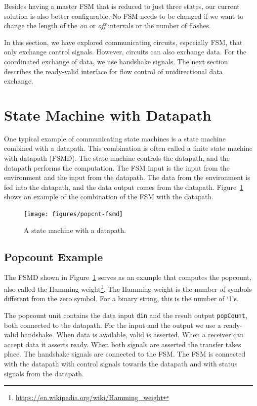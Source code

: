 \documentclass[%
    10pt,
    headinclude, footexclude,
    openright, %
    notitlepage,
    cleardoubleempty,
    headsepline,
    pointlessnumbers,
    bibtotoc, idxtotoc,
    ]{scrbook}
\newcommand{\code}[1]{{\small{\texttt{#1}}}}
\newcommand{\myref}[2]{\href{#1}{#2}}
\renewcommand{\myref}[2]{{#2}{\footnote{\url{#1}}}}
\begin{document}

Besides having a master FSM that is reduced to just three states, our current solution
is also better configurable. No FSM needs to be changed if we want to change
the length of the \emph{on} or \emph{off} intervals or the number of flashes.

In this section, we have explored communicating circuits, especially FSM, that
only exchange control signals. However, circuits can also exchange data.
For the coordinated exchange of data, we use handshake signals.
The next section describes the ready-valid interface for flow control of
unidirectional data exchange.

\section{State Machine with Datapath}

One typical example of communicating state machines is a state machine
combined with a datapath. This combination is often called a finite state machine
with datapath (FSMD). The state machine controls the datapath, and the datapath
performs the computation. The FSM input is the input from the environment and the input
from the datapath. The data from the environment is fed into the datapath, and the
data output comes from the datapath. Figure~\ref{fig:popcnt-fsmd} shows an example
of the combination of the FSM with the datapath.

\begin{figure}
  \centering
  \texttt{[image: figures/popcnt-fsmd]}
  \caption{A state machine with a datapath.}
  \label{fig:popcnt-fsmd}
\end{figure}

\subsection{Popcount Example}

The FSMD shown in Figure~\ref{fig:popcnt-fsmd} serves as an example that computes the
popcount, also called the \myref{https://en.wikipedia.org/wiki/Hamming_weight}{Hamming weight}.
The Hamming weight is the number of symbols different from the zero symbol.
For a binary string, this is the number of `1's.

The popcount unit contains the data input \code{din} and the result output \code{popCount},
both connected to the datapath. For the input and the output we use a ready-valid handshake.
When data is available, valid is asserted. When a receiver can accept data it asserts ready.
When both signals are asserted the transfer takes place. The handshake signals are connected
to the FSM. The FSM is connected with the datapath with control signals towards the datapath
and with status signals from the datapath.
\end{document}
